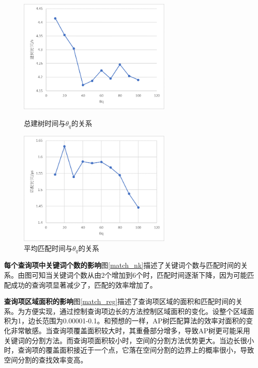 \documentclass[UTF8]{ctexart}
\begin{document}
\begin{figure}[htbp]
    \centering
    \begin{minipage}[t]{8cm}
        \centering
        \includegraphics[width=7.5cm]{construct_thetaq.png}
        \caption{总建树时间与$\theta_q$的关系}
        \label{construct_thetaq}
    \end{minipage}
    \begin{minipage}[t]{8cm}
        \centering
        \includegraphics[width=7.5cm]{match_thetaq.png}
        \caption{平均匹配时间与$\theta_q$的关系}
        \label{match_thetaq}
    \end{minipage}
\end{figure}

\textbf{每个查询项中关键词个数的影响}\quad 图\ref{match_nk}描述了关键词个数与匹配时间的关系。由图可知当关键词个数从由2个增加到6个时，匹配时间逐渐下降，因为可能匹配成功的查询项显著减少了，匹配的效率增加了。

\textbf{查询项区域面积的影响}\quad 图\ref{match_reg}描述了查询项区域的面积和匹配时间的关系。为方便实现，通过控制查询项边长的方法控制区域面积的变化。设整个区域面积为1，边长范围为0.00001-0.1。和预想的一样，AP树匹配算法的效率对面积的变化非常敏感。当查询项覆盖面积较大时，其重叠部分增多，导致AP树更可能采用关键词的分割方法。而查询项面积较小时，空间的分割方法优势更大。当边长很小时，查询项的覆盖面积接近于一个点，它落在空间分割的边界上的概率很小，导致空间分割的查找效率变高。
\end{document}
